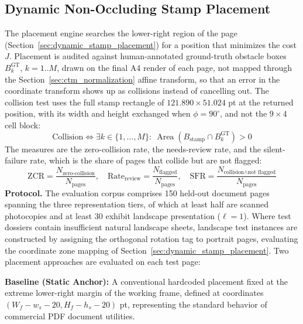 \subsection{Dynamic Non-Occluding Stamp Placement}
\label{sec:eval_stamp_placement}

The placement engine searches the lower-right region of the page (Section~\ref{sec:dynamic_stamp_placement}) for a position that minimizes the cost $J$. Placement is audited against human-annotated ground-truth obstacle boxes $B_k^{\mathrm{GT}}$, $k=1..M$, drawn on the final A4 render of each page, not mapped through the Section~\ref{sec:ctm_normalization} affine transform, so that an error in the coordinate transform shows up as collisions instead of cancelling out. The collision test uses the full stamp rectangle of $121.890 \times 51.024$ pt at the returned position, with its width and height exchanged when $\phi = 90^\circ$, and not the $9 \times 4$ cell block:
\begin{equation}
\label{eq:collision_indicator}
\text{Collision}\iff\exists k\in\{1,\ldots,M\}:\ \operatorname{Area}(B_{\text{stamp}}\cap B_k^{\text{GT}})>0
\end{equation}
The measures are the zero-collision rate, the needs-review rate, and the silent-failure rate, which is the share of pages that collide but are not flagged:
\begin{equation}
\label{eq:collision_rates}
\mathrm{ZCR}=\frac{N_{\text{zero-collision}}}{N_{\text{pages}}},\quad
\mathrm{Rate}_{\text{review}}=\frac{N_{\text{flagged}}}{N_{\text{pages}}},\quad
\mathrm{SFR}=\frac{N_{\text{collision}\land\text{not flagged}}}{N_{\text{pages}}}
\end{equation}
\textbf{Protocol.} The evaluation corpus comprises 150 held-out document pages spanning the three representation tiers, of which at least half are scanned photocopies and at least 30 exhibit landscape presentation ($\ell=1$). Where test dossiers contain insufficient natural landscape sheets, landscape test instances are constructed by assigning the orthogonal rotation tag to portrait pages, evaluating the coordinate zone mapping of Section~\ref{sec:dynamic_stamp_placement}. Two placement approaches are evaluated on each test page:

\textbf{Baseline (Static Anchor):} A conventional hardcoded placement fixed at the extreme lower-right margin of the working frame, defined at coordinates $(W_f-w_s-20,H_f-h_s-20)$ pt, representing the standard behavior of commercial PDF document utilities.

